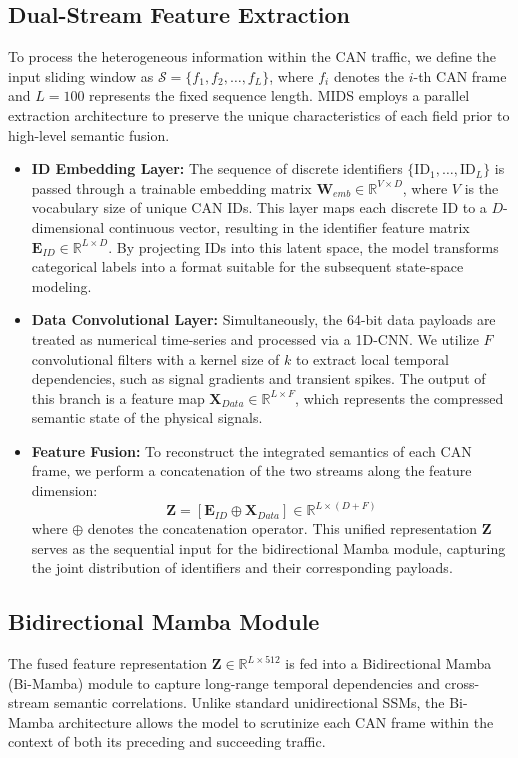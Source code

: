 \documentclass[lettersize,journal]{IEEEtran}
\begin{document}
\subsection{Dual-Stream Feature Extraction}
To process the heterogeneous information within the CAN traffic, we define the input sliding window as $\mathcal{S} = \{f_1, f_2, \dots, f_L\}$, where $f_i$ denotes the $i$-th CAN frame and $L=100$ represents the fixed sequence length. MIDS employs a parallel extraction architecture to preserve the unique characteristics of each field prior to high-level semantic fusion.
\begin{itemize}[leftmargin=*, nosep]
\item \textbf{ID Embedding Layer:} The sequence of discrete identifiers $\{\text{ID}_1, \dots, \text{ID}_L\}$ is passed through a trainable embedding matrix $\mathbf{W}_{emb} \in \mathbb{R}^{V \times D}$, where $V$ is the vocabulary size of unique CAN IDs. This layer maps each discrete ID to a $D$-dimensional continuous vector, resulting in the identifier feature matrix $\mathbf{E}_{ID} \in \mathbb{R}^{L \times D}$. By projecting IDs into this latent space, the model transforms categorical labels into a format suitable for the subsequent state-space modeling.
\item \textbf{Data Convolutional Layer:} Simultaneously, the 64-bit data payloads are treated as numerical time-series and processed via a 1D-CNN. We utilize $F$ convolutional filters with a kernel size of $k$ to extract local temporal dependencies, such as signal gradients and transient spikes. The output of this branch is a feature map $\mathbf{X}_{Data} \in \mathbb{R}^{L \times F}$, which represents the compressed semantic state of the physical signals.
\item \textbf{Feature Fusion:} To reconstruct the integrated semantics of each CAN frame, we perform a concatenation of the two streams along the feature dimension:
\begin{equation}
    \mathbf{Z} = [ \mathbf{E}_{ID} \oplus \mathbf{X}_{Data} ] \in \mathbb{R}^{L \times (D+F)}
\end{equation}
where $\oplus$ denotes the concatenation operator. This unified representation $\mathbf{Z}$ serves as the sequential input for the bidirectional Mamba module, capturing the joint distribution of identifiers and their corresponding payloads.
\end{itemize}

\subsection{Bidirectional Mamba Module}
\label{sec:bimamba}
The fused feature representation $\mathbf{Z} \in \mathbb{R}^{L \times 512}$ is fed into a Bidirectional Mamba (Bi-Mamba) module to capture long-range temporal dependencies and cross-stream semantic correlations. Unlike standard unidirectional SSMs, the Bi-Mamba architecture allows the model to scrutinize each CAN frame within the context of both its preceding and succeeding traffic.
\end{document}
